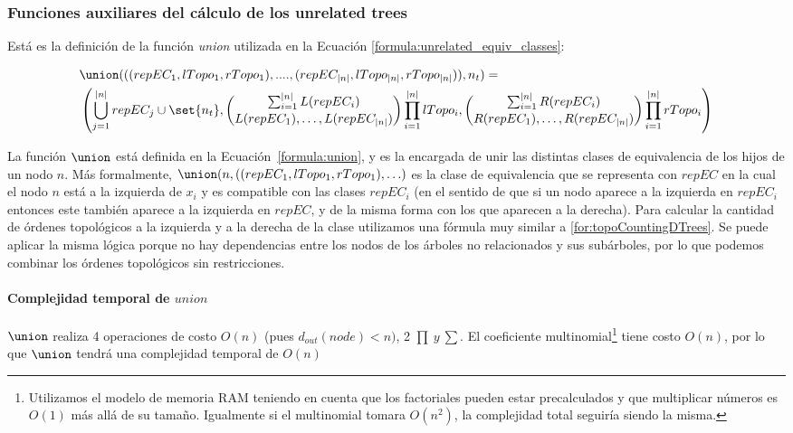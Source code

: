 \subsubsection{Funciones auxiliares del cálculo de los unrelated trees} \label{subsubSection:auxiliaryFormulasUnrelatedTrees}

Está es la definición de la función \textit{union} utilizada en la Ecuación \ref{formula:unrelated_equiv_classes}:

\begin{align}\label{formula:union}
&\union(((repEC_1, lTopo_1, rTopo_1), ...., (repEC_{|n|}, lTopo_{|n|}, rTopo_{|n|})), n_t) = \nonumber \\ 
&\left(\bigcup_{j=1}^{|n|} repEC_j \cup \set{n_t}, \binom{\sum_{i=1}^{|n|} L(repEC_i)}{L(repEC_1), \ldots, L(repEC_{|n|})} \prod_{i=1}^{|n|} lTopo_i, 
\binom{\sum_{i=1}^{|n|} R(repEC_i)}{R(repEC_1), \ldots, R(repEC_{|n|})} \prod_{i=1}^{|n|} rTopo_i \right)
\end{align}

La función $\union$ está definida en la Ecuación~\ref{formula:union}, y es la encargada de unir las distintas clases de equivalencia de los hijos de un nodo $n$. Más formalmente, $\union(n, ((repEC_1, lTopo_1, rTopo_1), \ldots)$ es la clase de equivalencia que se representa con $repEC$ en la cual el nodo $n$ está a la izquierda de $x_i$ y es compatible con las clases $repEC_i$ (en el sentido de que si un nodo aparece a la izquierda en $repEC_i$ entonces este también aparece a la izquierda en $repEC$, y de la misma forma con los que aparecen a la derecha). Para calcular la cantidad de órdenes topológicos a la izquierda y a la derecha de la clase utilizamos una fórmula muy similar a \ref{for:topoCountingDTrees}. Se puede aplicar la misma lógica porque no hay dependencias entre los nodos de los árboles no relacionados y sus subárboles, por lo que podemos combinar los órdenes topológicos sin restricciones.

\paragraph{Complejidad temporal de $union$}

$\union$ realiza 4 operaciones de costo $O(n)$ (pues $d_{out}(node)<n)$, 2 $\prod \ y \ \sum$. El coeficiente multinomial\footnote{Utilizamos el modelo de 
memoria RAM teniendo en cuenta que los factoriales pueden estar precalculados y que multiplicar números es $O(1)$ más allá de su tamaño. Igualmente si el multinomial tomara $O(n^2)$, la complejidad total seguiría siendo la misma.} tiene costo $O(n)$, por lo que $\union$ tendrá una complejidad temporal de $O(n)$



